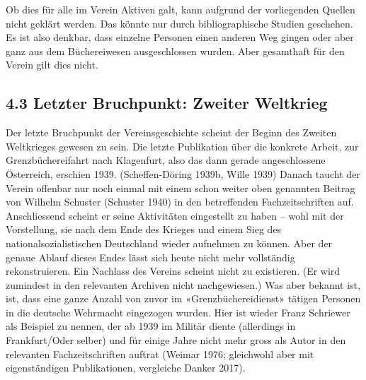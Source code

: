 \documentclass[a4paper,
fontsize=11pt,
oneside,
numbers=noperiodatend,
parskip=half-,
bibliography=totoc,
final
]{scrartcl}
\begin{document}
Ob dies für alle im Verein Aktiven galt, kann aufgrund der vorliegenden
Quellen nicht geklärt werden. Das könnte nur durch bibliographische
Studien geschehen. Es ist also denkbar, dass einzelne Personen einen
anderen Weg gingen oder aber ganz aus dem Büchereiwesen ausgeschlossen
wurden. Aber gesamthaft für den Verein gilt dies nicht.

\hypertarget{letzter-bruchpunkt-zweiter-weltkrieg}{%
\subsection{4.3 Letzter Bruchpunkt: Zweiter
Weltkrieg}\label{letzter-bruchpunkt-zweiter-weltkrieg}}

Der letzte Bruchpunkt der Vereinsgeschichte scheint der Beginn des
Zweiten Weltkrieges gewesen zu sein. Die letzte Publikation über die
konkrete Arbeit, zur Grenzbüchereifahrt nach Klagenfurt, also das dann
gerade angeschlossene Österreich, erschien 1939. (Scheffen-Döring 1939b,
Wille 1939) Danach taucht der Verein offenbar nur noch einmal mit einem
schon weiter oben genannten Beitrag von Wilhelm Schuster (Schuster 1940)
in den betreffenden Fachzeitschriften auf. Anschliessend scheint er
seine Aktivitäten eingestellt zu haben -- wohl mit der Vorstellung, sie
nach dem Ende des Krieges und einem Sieg des nationalsozialistischen
Deutschland wieder aufnehmen zu können. Aber der genaue Ablauf dieses
Endes lässt sich heute nicht mehr vollständig rekonstruieren. Ein
Nachlass des Vereins scheint nicht zu existieren. (Er wird zumindest in
den relevanten Archiven nicht nachgewiesen.) Was aber bekannt ist, ist,
dass eine ganze Anzahl von zuvor im «Grenzbüchereidienst» tätigen
Personen in die deutsche Wehrmacht eingezogen wurden. Hier ist wieder
Franz Schriewer als Beispiel zu nennen, der ab 1939 im Militär diente
(allerdings in Frankfurt/Oder selber) und für einige Jahre nicht mehr
gross als Autor in den relevanten Fachzeitschriften auftrat (Weimar
1976; gleichwohl aber mit eigenständigen Publikationen, vergleiche
Danker 2017).
\end{document}
